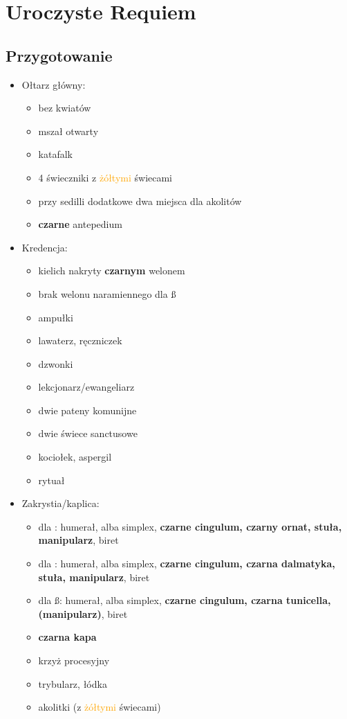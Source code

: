 \chapter{Uroczyste Requiem}

\section{Przygotowanie}%

\begin{itemize}
	\item Ołtarz główny:
		\begin{itemize}
			\item bez kwiatów
			\item mszał otwarty
			\item katafalk
			\item 4 świeczniki z \textcolor{orange}{żółtymi} świecami
			\item przy sedilli dodatkowe dwa miejsca dla akolitów
			\item \textbf{czarne} antepedium
		\end{itemize}
	\item Kredencja:
		\begin{itemize}
			\item kielich nakryty \textbf{czarnym} welonem
			\item brak welonu naramiennego dla \ss
			\item ampułki
			\item lawaterz, ręczniczek
			\item dzwonki
			\item lekcjonarz/ewangeliarz
			\item dwie pateny komunijne
			\item dwie świece sanctusowe
			\item kociołek, aspergil
			\item rytuał
		\end{itemize}
	\item Zakrystia/kaplica:
		\begin{itemize}
			\item dla \ii: humerał, alba simplex, \textbf{czarne
				cingulum, czarny ornat, stuła, manipularz},
				biret
			\item dla \dd: humerał, alba simplex, \textbf{czarne cingulum,
				czarna dalmatyka, stuła, manipularz}, biret
			\item dla \ss: humerał, alba simplex, \textbf{czarne cingulum,
				czarna tunicella, (manipularz)}, biret
			\item \textbf{czarna kapa}
			\item krzyż procesyjny
			\item trybularz, łódka
			\item akolitki (z \textcolor{orange}{żółtymi} świecami)
		\end{itemize}
\end{itemize}

